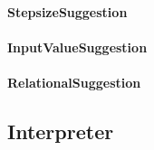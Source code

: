\documentclass[parskip=full]{scrartcl}
\begin{document}
\paragraph{StepsizeSuggestion}
\paragraph{InputValueSuggestion}
\paragraph{RelationalSuggestion}

\subsection{Interpreter}
\end{document}
